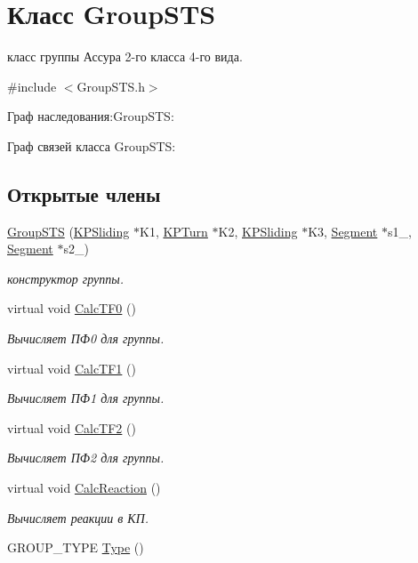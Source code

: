 \hypertarget{class_group_s_t_s}{
\section{Класс GroupSTS}
\label{class_group_s_t_s}
}


класс группы Ассура 2-\/го класса 4-\/го вида.  




{\ttfamily \#include $<$GroupSTS.h$>$}



Граф наследования:GroupSTS:


Граф связей класса GroupSTS:
\subsection*{Открытые члены}
\begin{DoxyCompactItemize}
\item 
\hyperlink{class_group_s_t_s_a627527fdf76d209c4d52f1a7acfebf35}{GroupSTS} (\hyperlink{class_k_p_sliding}{KPSliding} $\ast$K1, \hyperlink{class_k_p_turn}{KPTurn} $\ast$K2, \hyperlink{class_k_p_sliding}{KPSliding} $\ast$K3, \hyperlink{class_segment}{Segment} $\ast$s1\_\-, \hyperlink{class_segment}{Segment} $\ast$s2\_\-)
\begin{DoxyCompactList}\small\item\em конструктор группы. \item\end{DoxyCompactList}\item 
virtual void \hyperlink{class_group_s_t_s_a02cdc01623b272f1c4da3ab661d2838e}{CalcTF0} ()
\begin{DoxyCompactList}\small\item\em Вычисляет ПФ0 для группы. \item\end{DoxyCompactList}\item 
virtual void \hyperlink{class_group_s_t_s_a041ba5c9e40f04f197c00fa5e2f20401}{CalcTF1} ()
\begin{DoxyCompactList}\small\item\em Вычисляет ПФ1 для группы. \item\end{DoxyCompactList}\item 
virtual void \hyperlink{class_group_s_t_s_a0ba009c0521ea98da8d5c14e5df92591}{CalcTF2} ()
\begin{DoxyCompactList}\small\item\em Вычисляет ПФ2 для группы. \item\end{DoxyCompactList}\item 
virtual void \hyperlink{class_group_s_t_s_a828749b993df8b2f52680543074fc2fd}{CalcReaction} ()
\begin{DoxyCompactList}\small\item\em Вычисляет реакции в КП. \item\end{DoxyCompactList}\item 
GROUP\_\-TYPE \hyperlink{class_group_s_t_s_a0534c0e7672c525e549a026f651d51fe}{Type} ()
\end{DoxyCompactItemize}
